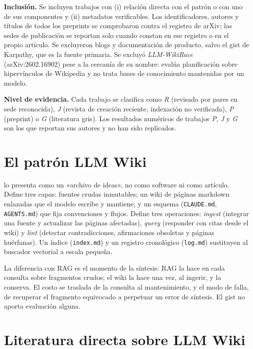 \documentclass[11pt,letterpaper]{article}
\begin{document}
\textbf{Inclusión.} Se incluyen trabajos con (i) relación directa con el patrón o con uno de sus componentes y (ii) metadatos verificables. Los identificadores, autores y títulos de todos los preprints se comprobaron contra el registro de arXiv; las sedes de publicación se reportan solo cuando constan en ese registro o en el propio artículo. Se excluyeron blogs y documentación de producto, salvo el gist de Karpathy, que es la fuente primaria. Se excluyó \emph{LLM-WikiRace} (arXiv:2602.16902) pese a la cercanía de su nombre: evalúa planificación sobre hipervínculos de Wikipedia y no trata bases de conocimiento mantenidas por un modelo.

\textbf{Nivel de evidencia.} Cada trabajo se clasifica como \emph{R} (revisado por pares en sede reconocida), \emph{J} (revista de creación reciente, indexación no verificada), \emph{P} (preprint) o \emph{G} (literatura gris). Los resultados numéricos de trabajos \emph{P}, \emph{J} y \emph{G} son los que reportan sus autores y no han sido replicados.

\section{El patrón LLM Wiki}

\citet{karpathy2026} lo presenta como un «archivo de ideas», no como software ni como artículo. Define tres capas: fuentes crudas inmutables; un wiki de páginas markdown enlazadas que el modelo escribe y mantiene; y un esquema (\texttt{CLAUDE.md}, \texttt{AGENTS.md}) que fija convenciones y flujos. Define tres operaciones: \emph{ingest} (integrar una fuente y actualizar las páginas afectadas), \emph{query} (responder con citas desde el wiki) y \emph{lint} (detectar contradicciones, afirmaciones obsoletas y páginas huérfanas). Un índice (\texttt{index.md}) y un registro cronológico (\texttt{log.md}) sustituyen al buscador vectorial a escala pequeña.

La diferencia con RAG \citep{lewis2020} es el momento de la síntesis: RAG la hace en cada consulta sobre fragmentos crudos; el wiki la hace una vez, al ingerir, y la conserva. El costo se traslada de la consulta al mantenimiento, y el modo de falla, de recuperar el fragmento equivocado a perpetuar un error de síntesis. El gist no aporta evaluación alguna.

\section{Literatura directa sobre LLM Wiki}
\end{document}
